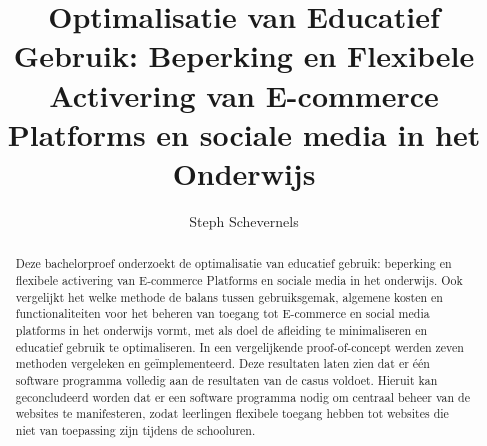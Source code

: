 \documentclass{hogent-article}
\title{Optimalisatie van Educatief Gebruik: Beperking en Flexibele Activering van E-commerce Platforms en sociale media in het Onderwijs}
\author{Steph Schevernels}
\begin{document}
\begin{abstract}
   Deze bachelorproef onderzoekt de optimalisatie van educatief gebruik: beperking en flexibele activering van E-commerce Platforms en sociale media in het onderwijs. Ook vergelijkt het welke methode de balans tussen gebruiksgemak, algemene kosten en functionaliteiten voor het beheren van toegang tot E-commerce en social media platforms in het onderwijs vormt, met als doel de afleiding te minimaliseren en educatief gebruik te optimaliseren. In een vergelijkende proof-of-concept werden zeven methoden vergeleken en geïmplementeerd. Deze resultaten laten zien dat er één software programma volledig aan de resultaten van de casus voldoet. Hieruit kan geconcludeerd worden dat er een software programma nodig om centraal beheer van de websites te manifesteren, zodat leerlingen flexibele toegang hebben tot websites die niet van toepassing zijn tijdens de schooluren.
\end{abstract}

\tableofcontents



\printbibliography[heading=bibintoc]
\end{document}
